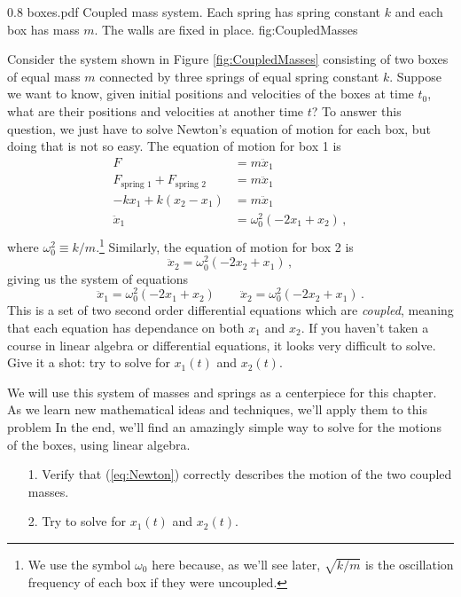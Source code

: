
\quickfig
{0.8\columnwidth}
{boxes.pdf}
{Coupled mass system.
Each spring has spring constant $k$ and each box has mass $m$.
The walls are fixed in place.}
{fig:CoupledMasses}

Consider the system shown in Figure \ref{fig:CoupledMasses} consisting of two boxes of equal mass $m$ connected by three springs of equal spring constant $k$.
Suppose we want to know, given initial positions and velocities of the boxes at time $t_{0}$, what are their positions and velocities at another time $t$?
To answer this question,  we just have to solve Newton's equation of motion for each box, but doing that is not so easy.
The equation of motion for box 1 is
\begin{align*}
  F &= m \ddot x_1 \\
  F_\text{spring 1} + F_\text{spring 2} &= m \ddot x_1 \\
  -k x_1 + k (x_2 - x_1) &= m \ddot x_1 \\
  \ddot{x}_1 &= \omega_0^2 (-2 x_1 + x_2) \, , \\
\end{align*}
where $\omega_0^2 \equiv k/m$.\footnote{We use the symbol $\omega_0$ here because, as we'll see later, $\sqrt{k/m}$ is the oscillation frequency of each box if they were uncoupled.}
Similarly, the equation of motion for box 2 is
\begin{equation*}
  \ddot{x}_2 = \omega_0^2 (-2 x_2 + x_1) \, ,
\end{equation*}
giving us the system of equations
\begin{equation} \label{eq:Newton}
  \ddot{x}_{1} = \omega_0^2 (-2x_1 + x_2)
  \qquad
  \ddot{x}_{2} = \omega_0^2 (-2x_2 + x_1)
  \, .
\end{equation}
This is a set of two second order differential equations which are \textit{coupled}, meaning that each equation has dependance on both $x_1$ and $x_2$.
If you haven't taken a course in linear algebra or differential equations, it looks very difficult to solve.
Give it a shot: try to solve for $x_1(t)$ and $x_2(t)$.

We will use this system of masses and springs as a centerpiece for this chapter.
As we learn new mathematical ideas and techniques, we'll apply them to this problem
In the end, we'll find an amazingly simple way to solve for the motions of the boxes, using linear algebra.


\begin{itemize}
  \item[1.] Verify that (\ref{eq:Newton}) correctly describes the motion of the two coupled masses.
  \item[2.] Try to solve for $x_{1}(t)$ and $x_{2}(t)$.
\end{itemize}

